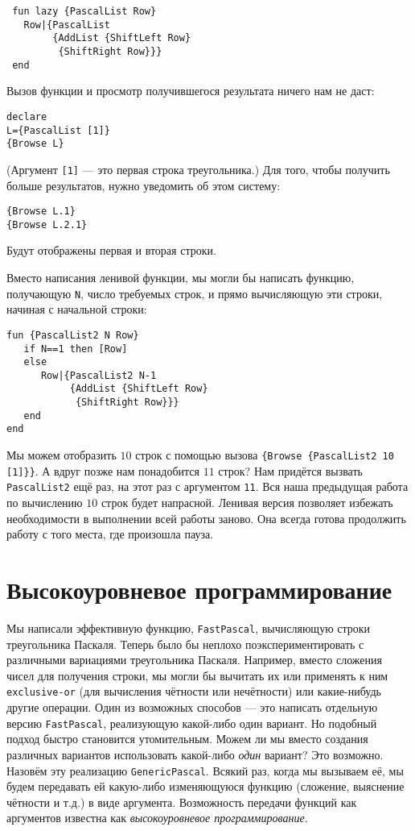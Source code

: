 \begin{lstlisting}
 fun lazy {PascalList Row}
   Row|{PascalList
        {AddList {ShiftLeft Row}
         {ShiftRight Row}}}
 end
\end{lstlisting}



Вызов функции и просмотр получившегося результата ничего нам не даст:

\begin{lstlisting}
declare
L={PascalList [1]}
{Browse L}
\end{lstlisting}

(Аргумент \lstinline|[1]| --- это первая строка треугольника.) Для того, чтобы получить больше результатов, нужно уведомить об этом систему:

\begin{lstlisting}
{Browse L.1}
{Browse L.2.1}
\end{lstlisting}

Будут отображены первая и вторая строки.

Вместо написания ленивой функции, мы могли бы написать функцию, получающую \lstinline|N|, число требуемых строк, и прямо вычисляющую эти строки, начиная с начальной строки:



\begin{lstlisting}
fun {PascalList2 N Row}
   if N==1 then [Row]
   else
      Row|{PascalList2 N-1
           {AddList {ShiftLeft Row}
            {ShiftRight Row}}}
   end
end
\end{lstlisting}


Мы можем отобразить $10$ строк с помощью вызова \lstinline|{Browse {PascalList2 10 [1]}}|. А вдруг позже нам понадобится $11$ строк? Нам придётся вызвать \lstinline|PascalList2| ещё раз, на этот раз с аргументом \lstinline|11|. Вся наша предыдущая работа по вычислению $10$ строк будет напрасной. Ленивая версия позволяет избежать необходимости в выполнении всей работы заново. Она всегда готова продолжить работу с того места, где произошла пауза.

\section{Высокоуровневое программирование}

Мы написали эффективную функцию, \lstinline|FastPascal|, вычисляющую строки треугольника Паскаля. Теперь было бы неплохо поэкспериментировать с различными вариациями треугольника Паскаля. Например, вместо сложения чисел для получения строки, мы могли бы вычитать их или применять к ним \lstinline|exclusive-or| (для вычисления чётности или нечётности) или какие-нибудь другие операции. Один из возможных способов --- это написать отдельную версию \lstinline|FastPascal|, реализующую какой-либо один вариант. Но подобный подход быстро становится утомительным. Можем ли мы вместо создания различных вариантов использовать какой-либо \emph{один} вариант? Это возможно. Назовём эту реализацию \lstinline|GenericPascal|. Всякий раз, когда мы вызываем её, мы будем передавать ей какую-либо изменяющуюся функцию (сложение, выяснение чётности и т.д.) в виде аргумента. Возможность передачи функций как аргументов известна как \emph{высокоуровневое программирование}.

